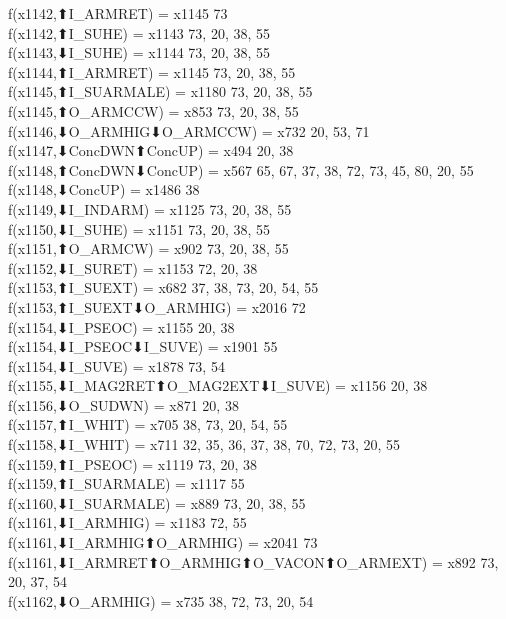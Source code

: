 f(x1142,⬆I_ARMRET) = x1145 {73} \\
f(x1142,⬆I_SUHE) = x1143 {73, 20, 38, 55} \\
f(x1143,⬇I_SUHE) = x1144 {73, 20, 38, 55} \\
f(x1144,⬆I_ARMRET) = x1145 {73, 20, 38, 55} \\
f(x1145,⬆I_SUARMALE) = x1180 {73, 20, 38, 55} \\
f(x1145,⬆O_ARMCCW) = x853 {73, 20, 38, 55} \\
f(x1146,⬇O_ARMHIG⬇O_ARMCCW) = x732 {20, 53, 71} \\
f(x1147,⬇ConcDWN⬆ConcUP) = x494 {20, 38} \\
f(x1148,⬆ConcDWN⬇ConcUP) = x567 {65, 67, 37, 38, 72, 73, 45, 80, 20, 55} \\
f(x1148,⬇ConcUP) = x1486 {38} \\
f(x1149,⬇I_INDARM) = x1125 {73, 20, 38, 55} \\
f(x1150,⬇I_SUHE) = x1151 {73, 20, 38, 55} \\
f(x1151,⬆O_ARMCW) = x902 {73, 20, 38, 55} \\
f(x1152,⬇I_SURET) = x1153 {72, 20, 38} \\
f(x1153,⬆I_SUEXT) = x682 {37, 38, 73, 20, 54, 55} \\
f(x1153,⬆I_SUEXT⬇O_ARMHIG) = x2016 {72} \\
f(x1154,⬇I_PSEOC) = x1155 {20, 38} \\
f(x1154,⬇I_PSEOC⬇I_SUVE) = x1901 {55} \\
f(x1154,⬇I_SUVE) = x1878 {73, 54} \\
f(x1155,⬇I_MAG2RET⬆O_MAG2EXT⬇I_SUVE) = x1156 {20, 38} \\
f(x1156,⬇O_SUDWN) = x871 {20, 38} \\
f(x1157,⬆I_WHIT) = x705 {38, 73, 20, 54, 55} \\
f(x1158,⬇I_WHIT) = x711 {32, 35, 36, 37, 38, 70, 72, 73, 20, 55} \\
f(x1159,⬆I_PSEOC) = x1119 {73, 20, 38} \\
f(x1159,⬆I_SUARMALE) = x1117 {55} \\
f(x1160,⬇I_SUARMALE) = x889 {73, 20, 38, 55} \\
f(x1161,⬇I_ARMHIG) = x1183 {72, 55} \\
f(x1161,⬇I_ARMHIG⬆O_ARMHIG) = x2041 {73} \\
f(x1161,⬇I_ARMRET⬆O_ARMHIG⬆O_VACON⬆O_ARMEXT) = x892 {73, 20, 37, 54} \\
f(x1162,⬇O_ARMHIG) = x735 {38, 72, 73, 20, 54} \\

